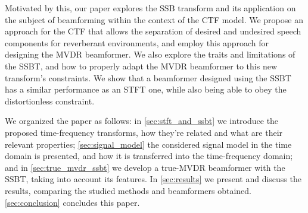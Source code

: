 Motivated by this, our paper explores the SSB transform and its application on the subject of beamforming within the context of the CTF model. We propose an approach for the CTF that allows the separation of desired and undesired speech components for reverberant environments, and employ this approach for designing the MVDR beamformer. We also explore the traits and limitations of the SSBT, and how to properly adapt the MVDR beamformer to this new transform's constraints. We show that a beamformer designed using the SSBT has a similar performance as an STFT one, while also being able to obey the distortionless constraint.

We organized the paper as follows:
in \cref{sec:stft_and_ssbt} we introduce the proposed time-frequency transforms, how they're related and what are their relevant properties;
\cref{sec:signal_model} the considered signal model in the time domain is presented, and how it is transferred into the time-frequency domain;
and in \cref{sec:true_mvdr_ssbt} we develop a true-MVDR beamformer with the SSBT, taking into account its features.
In \cref{sec:results} we present and discuss the results, comparing the studied methods and beamformers obtained.
\cref{sec:conclusion} concludes this paper.